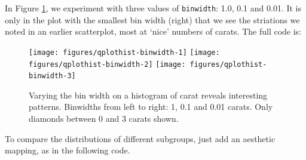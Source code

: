 In Figure \ref{fig:hist-binwidth}, we experiment with three values of
\texttt{binwidth}: 1.0, 0.1 and 0.01. It is only in the plot with the
smallest bin width (right) that we see the striations we noted in an
earlier scatterplot, most at `nice' numbers of carats. The full code is:

\begin{Shaded}
\begin{Highlighting}[]
  \NormalTok{, } \NormalTok{, }
   \NormalTok{(}\NormalTok{,}\NormalTok{))}
  \NormalTok{, } \NormalTok{,}
   \NormalTok{(}\NormalTok{,}\NormalTok{))}
  \NormalTok{, } \NormalTok{,}
   \NormalTok{(}\NormalTok{,}\NormalTok{))}
\end{Highlighting}
\end{Shaded}

\begin{figure}

{\centering \texttt{[image: figures/qplothist-binwidth-1]} \texttt{[image: figures/qplothist-binwidth-2]} \texttt{[image: figures/qplothist-binwidth-3]} 

}

\caption{Varying the bin width on a histogram of carat reveals interesting patterns.  Binwidths from left to right: 1, 0.1 and 0.01 carats. Only diamonds between 0 and 3 carats shown.\label{fig:hist-binwidth}}
\end{figure}

To compare the distributions of different subgroups, just add an
aesthetic mapping, as in the following code.

\begin{Shaded}
\begin{Highlighting}[]
  \NormalTok{, } 
  \NormalTok{, } 
\end{Highlighting}
\end{Shaded}


